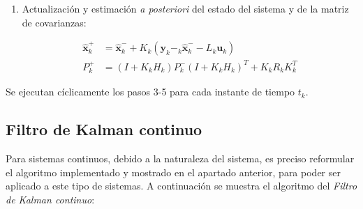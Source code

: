 \begin{enumerate}
\item Actualización y estimación \emph{a posteriori} del estado del sistema y de la matriz de covarianzas:

\begin{equation}
\begin{split}
	\boldsymbol{\hat{x}}_k^{+} &= \boldsymbol{\hat{x}}_k^{-} + K_k(\boldsymbol{y}_k - _k\boldsymbol{\hat{x}}_k^{-} - L_k\boldsymbol{u}_k) \\
	P_k^{+} &= (I + K_kH_k)P_k^{-}(I + K_kH_k)^T + K_kR_kK_k^T
\end{split}
\end{equation}

\end{enumerate}

Se ejecutan cíclicamente los pasos 3-5 para cada instante de tiempo $t_k$. \par 

\subsection{Filtro de Kalman continuo}

Para sistemas continuos, debido a la naturaleza del sistema, es preciso reformular el algoritmo implementado y mostrado en el apartado anterior, para poder ser aplicado a este tipo de sistemas. A continuación se muestra el algoritmo del \emph{Filtro de Kalman continuo}:

